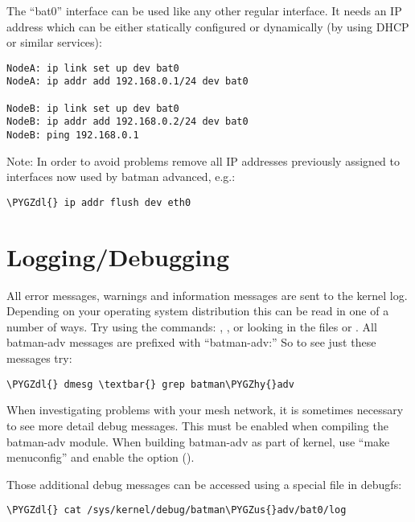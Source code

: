 \documentclass[a4paper,8pt,english]{sphinxmanual}
\def\PYGZus{\char`\_}
\def\PYGZdl{\char`\$}
\def\PYGZhy{\char`\-}
\begin{document}
The ``bat0'' interface can be used like any other regular interface. It needs an
IP address which can be either statically configured or dynamically (by using
DHCP or similar services):

\begin{Verbatim}[commandchars=\\\{\}]
NodeA: ip link set up dev bat0
NodeA: ip addr add 192.168.0.1/24 dev bat0

NodeB: ip link set up dev bat0
NodeB: ip addr add 192.168.0.2/24 dev bat0
NodeB: ping 192.168.0.1
\end{Verbatim}

Note: In order to avoid problems remove all IP addresses previously assigned to
interfaces now used by batman advanced, e.g.:

\begin{Verbatim}[commandchars=\\\{\}]
\PYGZdl{} ip addr flush dev eth0
\end{Verbatim}


\section{Logging/Debugging}
\label{networking/batman-adv:logging-debugging}
All error messages, warnings and information messages are sent to the kernel
log. Depending on your operating system distribution this can be read in one of
a number of ways. Try using the commands: , , or looking in
the files  or . All batman-adv messages
are prefixed with ``batman-adv:'' So to see just these messages try:

\begin{Verbatim}[commandchars=\\\{\}]
\PYGZdl{} dmesg \textbar{} grep batman\PYGZhy{}adv
\end{Verbatim}

When investigating problems with your mesh network, it is sometimes necessary to
see more detail debug messages. This must be enabled when compiling the
batman-adv module. When building batman-adv as part of kernel, use ``make
menuconfig'' and enable the option 
().

Those additional debug messages can be accessed using a special file in
debugfs:

\begin{Verbatim}[commandchars=\\\{\}]
\PYGZdl{} cat /sys/kernel/debug/batman\PYGZus{}adv/bat0/log
\end{Verbatim}
\end{document}
